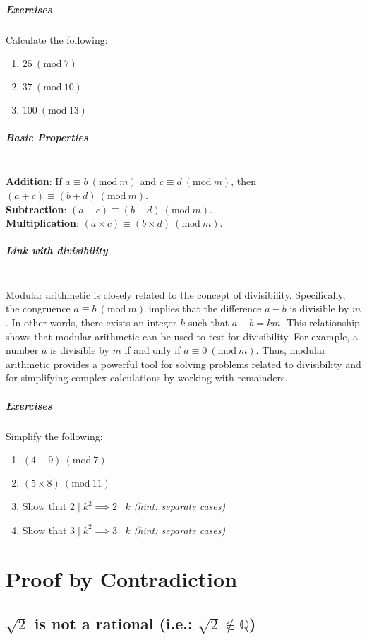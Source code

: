 \documentclass[]{article}
\begin{document}
	\subparagraph{Exercises}
	Calculate the following:
	\begin{enumerate}
		\item $25 \ (\text{mod} \ 7)$
		\item $37 \ (\text{mod} \ 10)$
		\item $100 \ (\text{mod} \ 13)$
	\end{enumerate}
	
	\subparagraph{Basic Properties}
	\noindent \\
	\textbf{Addition}: If $a \equiv b \ (\text{mod} \ m)$ and $c \equiv d \ (\text{mod} \ m)$, then $(a + c) \equiv (b + d) \ (\text{mod} \ m)$.
	\noindent \\
	\textbf{Subtraction}: $(a - c) \equiv (b - d) \ (\text{mod} \ m)$.
	\noindent \\
	\textbf{Multiplication}: $(a \times c) \equiv (b \times d) \ (\text{mod} \ m)$.
	
	\subparagraph{Link with divisibility}
	\noindent \\
	Modular arithmetic is closely related to the concept of divisibility.
	Specifically, the congruence $a \equiv b \ (\text{mod} \ m)$ implies that the difference $a - b$ is divisible by $m$.
	In other words, there exists an integer $k$ such that $a - b = km$.
	This relationship shows that modular arithmetic can be used to test for divisibility.
	For example, a number $a$ is divisible by $m$ if and only if $a \equiv 0 \ (\text{mod} \ m)$.
	Thus, modular arithmetic provides a powerful tool for solving problems related to divisibility and for simplifying complex calculations by working with remainders.
	
	\subparagraph{Exercises}
	Simplify the following:
	\begin{enumerate}
		\item $(4 + 9) \ (\text{mod} \ 7)$
		\item $(5 \times 8) \ (\text{mod} \ 11)$
		\item Show that $2 \mid k^2 \implies 2 \mid k$ \textit{(hint: separate cases)}		\item Show that $3 \mid k^2 \implies 3 \mid k$ \textit{(hint: separate cases)}
	\end{enumerate}

	\vspace{3cm}
	\section*{Proof by Contradiction}
	\subsection*{$\sqrt{2}$ is not a rational (i.e.: $\sqrt{2} \not\in \mathbb{Q}$)}
	
\end{document}
